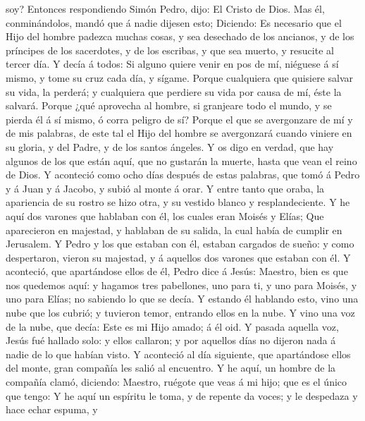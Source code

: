 soy? Entonces respondiendo Simón Pedro, dijo: El Cristo de Dios.
 Mas él, conminándolos, mandó que á nadie dijesen esto;
 Diciendo: Es necesario que el Hijo del hombre padezca
muchas cosas, y sea desechado de los ancianos, y de los príncipes de los
sacerdotes, y de los escribas, y que sea muerto, y resucite al tercer
día.  Y decía á todos: Si alguno quiere venir en pos de
mí, niéguese á sí mismo, y tome su cruz cada día, y sígame.
 Porque cualquiera que quisiere salvar su vida, la
perderá; y cualquiera que perdiere su vida por causa de mí, éste la
salvará.  Porque ¿qué aprovecha al hombre, si granjeare
todo el mundo, y se pierda él á sí mismo, ó corra peligro de sí?
 Porque el que se avergonzare de mí y de mis palabras, de
este tal el Hijo del hombre se avergonzará cuando viniere en su gloria,
y del Padre, y de los santos ángeles.  Y os digo en
verdad, que hay algunos de los que están aquí, que no gustarán la
muerte, hasta que vean el reino de Dios.  Y aconteció
como ocho días después de estas palabras, que tomó á Pedro y á Juan y á
Jacobo, y subió al monte á orar.  Y entre tanto que
oraba, la apariencia de su rostro se hizo otra, y su vestido blanco y
resplandeciente.  Y he aquí dos varones que hablaban con
él, los cuales eran Moisés y Elías;  Que aparecieron en
majestad, y hablaban de su salida, la cual había de cumplir en
Jerusalem.  Y Pedro y los que estaban con él, estaban
cargados de sueño: y como despertaron, vieron su majestad, y á aquellos
dos varones que estaban con él.  Y aconteció, que
apartándose ellos de él, Pedro dice á Jesús: Maestro, bien es que nos
quedemos aquí: y hagamos tres pabellones, uno para ti, y uno para
Moisés, y uno para Elías; no sabiendo lo que se decía.  Y
estando él hablando esto, vino una nube que los cubrió; y tuvieron
temor, entrando ellos en la nube.  Y vino una voz de la
nube, que decía: Este es mi Hijo amado; á él oid.  Y
pasada aquella voz, Jesús fué hallado solo: y ellos callaron; y por
aquellos días no dijeron nada á nadie de lo que habían visto.
 Y aconteció al día siguiente, que apartándose ellos del
monte, gran compañía les salió al encuentro.  Y he aquí,
un hombre de la compañía clamó, diciendo: Maestro, ruégote que veas á mi
hijo; que es el único que tengo:  Y he aquí un espíritu
le toma, y de repente da voces; y le despedaza y hace echar espuma, y
